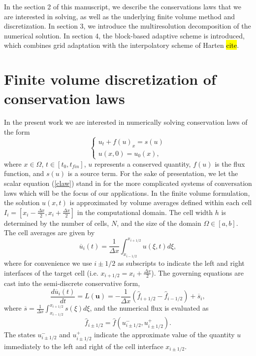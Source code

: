 \documentclass[]{article}
\begin{document}
    In the section 2 of this manuscript, we describe the conservations laws that
    we are interested in solving, as well as the underlying finite volume
    method and discretization. In section 3, we introduce the multiresolution
    decomposition of the numerical solution. In section 4, the block-based
    adaptive scheme is introduced, which combines grid adaptation with the
    interpolatory scheme of Harten \hl{cite}.
    
\section{Finite volume discretization of conservation laws}

    In the present work we are interested in numerically solving conservation
    laws of the form
    \begin{equation}
    \begin{cases}
      u_{t} + f(u)_{x} = s(u) \\    
      u(x,0) = u_{0}(x),
    \end{cases}
    \label{claw}
    \end{equation}
    where $x \in \Omega$, $t \in [t_{0},t_{fin}]$, $u$ represents a conserved
    quantity, $f(u)$ is the flux function, and $s(u)$ is a source term. For the
    sake of presentation, we let the scalar equation (\ref{claw}) stand in for
    the more complicated systems of conversation laws which will be the focus of
    our applications.  In the finite volume formulation, the solution $u(x,t)$
    is approximated by volume averages defined within each cell $I_{i} = \left[
    x_{i}-\frac{\Delta x}{2}, x_{i}+\frac{\Delta x}{2} \right]$ in the computational
    domain.  The cell width $h$ is determined by the number of cells, $N$, and
    the size of the domain $\Omega \in \left[a,b\right]$.  The cell averages are
    given by
    \begin{equation}
        \overline{u}_{i}(t) = \frac{1}{\Delta x} \int_{x_{i-1/2}}^{x_{i+1/2}} u(\xi,t) d \xi,
    \end{equation}
    where for convenience we use $i \pm 1/2$ as subscripts to indicate the left
    and right interfaces of the target cell (i.e.  $x_{i+1/2} = x_{i} +
    \frac{\Delta x}{2}$). The governing equations are cast into the semi-discrete
    conservative form,
    \begin{equation}
        \frac{d \overline{u}_{i}(t)}{dt} = L(\bm{u}) = -\frac{1}{\Delta x} \left( \hat{f}_{i+1/2} -
        \hat{f}_{i-1/2} \right) + \overline{s}_{i},
        \label{ode}
    \end{equation}
    where $\overline{s} = \frac{1}{\Delta x} \int_{x_{i-1/2}}^{x_{i+1/2}} s(\xi) d
    \xi$, and the numerical flux is evaluated as
    \begin{equation}
        \hat{f}_{i\pm1/2} = \hat{f}(u^{-}_{i\pm1/2}, u^{+}_{i\pm1/2}).
    \end{equation}
    The states $u^{-}_{i\pm1/2}$ and $u^{+}_{i\pm1/2}$ indicate the approximate
    value of the quantity $u$ immediately to the left and right of the cell
    interface $x_{i\pm1/2}$. 
    
\end{document}
